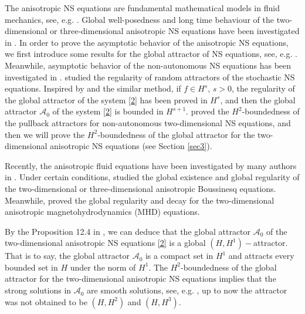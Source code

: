 \documentclass{elsarticle}
\theoremstyle{definition}
\numberwithin{equation}{section}
\newcommand{\A}{\mathcal{A}}
\begin{document}
The anisotropic  NS equations are fundamental mathematical models in fluid mechanics, see, e.g. \cite{bahouri,liang,paicu,temam}. Global well-posedness and long time behaviour of the two-dimensional or three-dimensional anisotropic   NS equations  have been investigated in \cite{bessaih,chemin,liujfa,liuarma,paicucmp,zhang}. In order to prove the asymptotic behavior of the  anisotropic  NS equations, we first introduce some results for the global attractor of NS equations, see, e.g. \cite{constantin,ju,liuvx1,rosa,sun,wang,zhao}. Meanwhile, asymptotic behavior of the non-autonomous NS equations has been investigated in \cite{cui24siads,cui24ma,hou,langa,lukaszewicz}. \cite{Brzezniak13,Brzezniak2018,Brzezniak,crauel97jdde,crauel,cui2025,dong,li,liu2018,mohammed,wang12,wang2023} studied the regularity of random attractors of the stochastic NS equations. Inspired by \cite{robinson01,robinson13} and the similar method, if $f\in H^s$, $s>0$, the regularity of the global attractor of the system \eqref{2} has been proved in $H^s$, and then the global attractor $\A_0$ of the system \eqref{2} is bounded in $H^{s+1}$. \cite{julia} proved the $H^2$-boundedness of the pullback attractors for non-autonomous  two-dimensional NS equations, and then we will prove the $H^2$-boundedness of the global attractor for the  two-dimensional anisotropic  NS equations (see Section \ref{sec3}).

Recently, the anisotropic  fluid equations have been investigated by many authors in \cite{chemin2000}. Under certain conditions, \cite{adhikari,adhikari2011,cao2013,danchin,larios,miao} studied the global existence and global regularity of  the two-dimensional or three-dimensional anisotropic Boussinesq equations. Meanwhile, \cite{cao,cao2014,dong2019,du,ren} proved the global regularity and decay for the two-dimensional anisotropic magnetohydrodynamics (MHD) equations.




By the Proposition 12.4 in \cite{robinson01}, we can deduce that the global attractor $\A_0$ of the two-dimensional anisotropic  NS equations \eqref{2} is a global $(H,H^1)-$attractor. That is to say, the global attractor $\A_0$ is a compact set in $H^1$ and attracts every bounded set in $H$ under the norm of $H^1$. The $H^2$-boundedness of the global attractor for the  two-dimensional anisotropic  NS equations implies that the strong solutions in $\A_0$ are smooth solutions, see, e.g. \cite{Ladyzenskaja,robinson01,temam}, up to now the attractor was not obtained to be $(H,H^2)$ and $(H,H^3)$.
\end{document}
